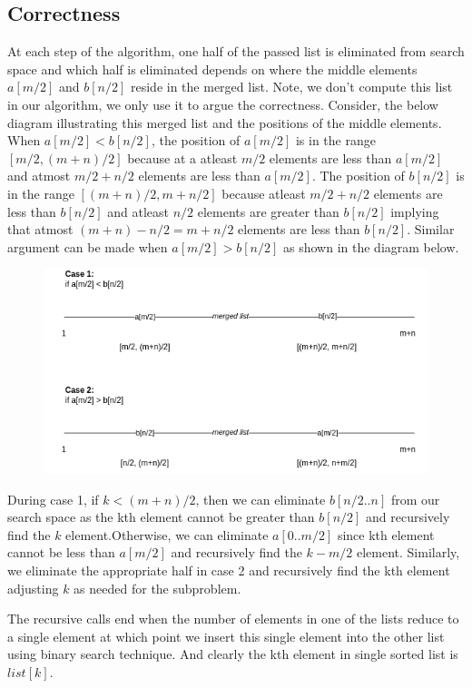 \documentclass{article}
\begin{document}
    \subsection*{Correctness}
    At each step of the algorithm, one half of the passed list is eliminated from search space and which half is eliminated depends on where the middle elements $a[m/2]$ and $b[n/2]$ reside in the merged list. Note, we don't compute this list in our algorithm, we only use it to argue the correctness. Consider, the below diagram illustrating this merged list and the positions of the middle elements. When $a[m/2] < b[n/2]$, the position of $a[m/2]$ is in the range $[m/2, (m+n)/2]$ because at a atleast $m/2$ elements are less than $a[m/2]$ and atmost $m/2 + n/2$ elements are less than $a[m/2]$. The position of $b[n/2]$ is in the range $[(m+n)/2, m+n/2]$ because atleast $m/2 + n/2$ elements are less than $b[n/2]$ and atleast $n/2$ elements are greater than $b[n/2]$ implying that atmost $(m+n)-n/2 = m+n/2$ elements are less than $b[n/2]$. Similar argument can be made when $a[m/2] > b[n/2]$ as shown in the diagram below.

    \begin{figure}[H]
        \includegraphics[width=1\textwidth]{findkth.png}
    \end{figure}

    During case 1, if $k < (m+n)/2$, then we can eliminate $b[n/2..n]$ from our search space as the kth element cannot be greater than $b[n/2]$ and recursively find the $k$ element.Otherwise, we can eliminate $a[0..m/2]$ since kth element cannot be less than $a[m/2]$ and recursively find the $k-m/2$ element. Similarly, we eliminate the appropriate half in case 2 and recursively find the kth element adjusting $k$ as needed for the subproblem.

    The recursive calls end when the number of elements in one of the lists reduce to a single element at which point we insert this single element into the other list using binary search technique. And clearly the kth element in single sorted list is $list[k]$.
\end{document}

